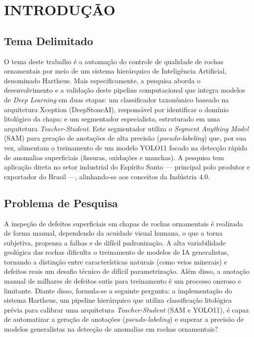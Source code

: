 \chapter[INTRODUÇÃO]{INTRODUÇÃO}

\section{Tema Delimitado}
O tema deste trabalho é a automação do controle de qualidade de rochas ornamentais por meio de um sistema hierárquico de Inteligência Artificial, denominado Hartheus. Mais especificamente, a pesquisa aborda o desenvolvimento e a validação deste pipeline computacional que integra modelos de \textit{Deep Learning} em duas etapas: um classificador taxonômico baseado na arquitetura Xception (DeepStoneAI), responsável por identificar o domínio litológico da chapa; e um segmentador especialista, estruturado em uma arquitetura \textit{Teacher-Student}. Este segmentador utiliza o \textit{Segment Anything Model} (SAM) para geração de anotações de alta precisão (\textit{pseudo-labeling}) que, por sua vez, alimentam o treinamento de um modelo YOLO11 focado na detecção rápida de anomalias superficiais (fissuras, oxidações e manchas). A pesquisa tem aplicação direta no setor industrial do Espírito Santo — principal polo produtor e exportador do Brasil —, alinhando-se aos conceitos da Indústria 4.0.

\section{Problema de Pesquisa}
A inspeção de defeitos superficiais em chapas de rochas ornamentais é realizada de forma manual, dependendo da acuidade visual humana, o que a torna subjetiva, propensa a falhas e de difícil padronização. A alta variabilidade geológica das rochas dificulta o treinamento de modelos de IA generalistas, tornando a distinção entre características naturais (como veios minerais) e defeitos reais um desafio técnico de difícil parametrização. Além disso, a anotação manual de milhares de defeitos sutis para treinamento é um processo oneroso e limitante. Diante disso, formula-se a seguinte pergunta: a implementação do sistema Hartheus, um pipeline hierárquico que utiliza classificação litológica prévia para calibrar uma arquitetura \textit{Teacher-Student} (SAM e YOLO11), é capaz de automatizar a geração de anotações (\textit{pseudo-labeling}) e superar a precisão de modelos generalistas na detecção de anomalias em rochas ornamentais?

